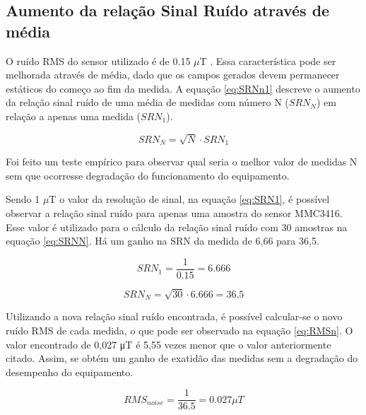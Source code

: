 \subsection{Aumento da relação Sinal Ruído através de média}

O ruído RMS do sensor utilizado é de 0.15 $\mu$T \cite{mcc3416}. Essa característica pode ser melhorada através de média, dado que os campos gerados devem permanecer estáticos do começo ao fim da medida. A equação \ref{eq:SRNn1} \cite{noiseRedArt} descreve o aumento da relação sinal ruído de uma média de medidas com número N ($SRN_N$) em relação a apenas uma medida ($SRN_1$).

\begin{equation}
    \label{eq:SRNn1}
    SRN_N = \sqrt{N}\cdot SRN_1
\end{equation}

Foi feito um teste empírico para observar qual seria o melhor valor de medidas N sem que ocorresse degradação do funcionamento do equipamento.

Sendo 1 $\mu$T o valor da resolução de sinal, na equação \ref{eq:SRN1}, é possível observar a relação sinal ruído para apenas uma amostra do sensor MMC3416. Esse valor é utilizado para o cálculo da relação sinal ruído com 30 amostras na equação \ref{eq:SRNN}. Há um ganho na SRN da medida de 6,66 para 36,5.


\begin{equation}
    \label{eq:SRN1}
    SRN_1 = \frac{1}{0.15} = 6.666
\end{equation}

\begin{equation}
    \label{eq:SRNN}
    SRN_N = \sqrt{30}\cdot 6.666 = 36.5
\end{equation}

Utilizando a nova relação sinal ruído encontrada, é possível calcular-se o novo ruído RMS de cada medida, o que pode ser observado na equação \ref{eq:RMSn}. O valor encontrado de 0,027 μT é 5,55 vezes menor que o valor anteriormente citado. Assim, se obtém um ganho de exatidão das medidas sem a degradação do desempenho do equipamento.

\begin{equation}
    \label{eq:RMSn}
    RMS_{noise} = \frac{1}{36.5} = 0.027 \mu T
\end{equation}